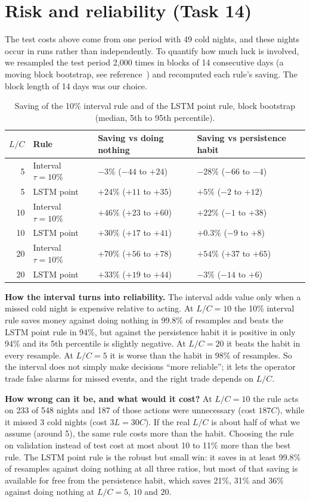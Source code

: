 \documentclass[11pt,a4paper]{article}
\begin{document}
\section{Risk and reliability (Task 14)}
The test costs above come from one period with 49 cold nights, and these nights occur in runs rather than independently. To quantify how much luck is involved, we resampled the test period 2,000 times in blocks of 14 consecutive days (a moving block bootstrap, see reference~\cite{kunsch}) and recomputed each rule's saving. The block length of 14 days was our choice.

\begin{table}[H]\centering\small
\caption{Saving of the 10\% interval rule and of the LSTM point rule, block bootstrap (median, 5th to 95th percentile).}
\begin{tabular}{rlll}
\toprule
$L/C$ & Rule & Saving vs doing nothing & Saving vs persistence habit\\
\midrule
5 & Interval $\tau=10\%$ & $-3\%$ ($-44$ to $+24$) & $-28\%$ ($-66$ to $-4$)\\
5 & LSTM point & $+24\%$ ($+11$ to $+35$) & $+5\%$ ($-2$ to $+12$)\\
10 & Interval $\tau=10\%$ & $+46\%$ ($+23$ to $+60$) & $+22\%$ ($-1$ to $+38$)\\
10 & LSTM point & $+30\%$ ($+17$ to $+41$) & $+0.3\%$ ($-9$ to $+8$)\\
20 & Interval $\tau=10\%$ & $+70\%$ ($+56$ to $+78$) & $+54\%$ ($+37$ to $+65$)\\
20 & LSTM point & $+33\%$ ($+19$ to $+44$) & $-3\%$ ($-14$ to $+6$)\\
\bottomrule
\end{tabular}
\end{table}

\textbf{How the interval turns into reliability.} The interval adds value only when a missed cold night is expensive relative to acting. At $L/C=10$ the 10\% interval rule saves money against doing nothing in 99.8\% of resamples and beats the LSTM point rule in 94\%, but against the persistence habit it is positive in only 94\% and its 5th percentile is slightly negative. At $L/C=20$ it beats the habit in every resample. At $L/C=5$ it is worse than the habit in 98\% of resamples. So the interval does not simply make decisions ``more reliable''; it lets the operator trade false alarms for missed events, and the right trade depends on $L/C$.

\textbf{How wrong can it be, and what would it cost?} At $L/C=10$ the rule acts on 233 of 548 nights and 187 of those actions were unnecessary (cost $187C$), while it missed 3 cold nights (cost $3L=30C$). If the real $L/C$ is about half of what we assume (around 5), the same rule costs more than the habit. Choosing the rule on validation instead of test cost at most about 10 to 11\% more than the best rule. The LSTM point rule is the robust but small win: it saves in at least 99.8\% of resamples against doing nothing at all three ratios, but most of that saving is available for free from the persistence habit, which saves 21\%, 31\% and 36\% against doing nothing at $L/C=5$, $10$ and $20$.
\end{document}
